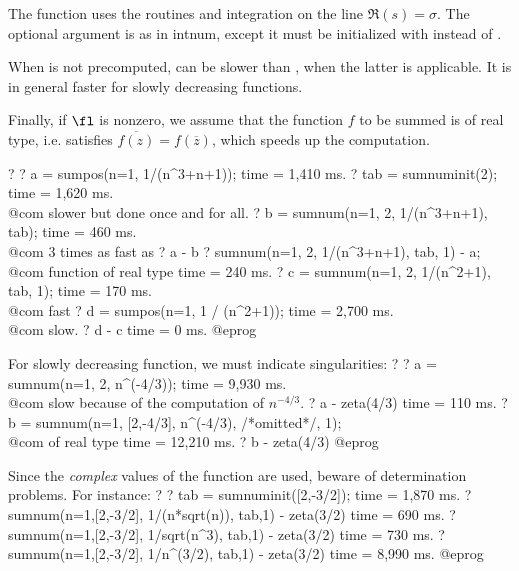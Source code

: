 The function uses the  routines and integration on the line
$\Re(s) = \sigma$. The optional argument  is as in intnum, except it
must be initialized with  instead of .

When  is not precomputed,  can be slower than
, when the latter is applicable. It is in general faster for
slowly decreasing functions.

Finally, if $\fl$ is nonzero, we assume that the function $f$ to be summed is
of real type, i.e. satisfies $\overline{f(z)}=f(\overline{z})$, which
speeds up the computation.

\bprog
? 
? a = sumpos(n=1, 1/(n^3+n+1));
time = 1,410 ms.
? tab = sumnuminit(2);
time = 1,620 ms. \\@com slower but done once and for all.
? b = sumnum(n=1, 2, 1/(n^3+n+1), tab);
time = 460 ms. \\@com 3 times as fast as 
? a - b
? sumnum(n=1, 2, 1/(n^3+n+1), tab, 1) - a; \\@com function of real type
time = 240 ms.
? c = sumnum(n=1, 2, 1/(n^2+1), tab, 1);
time = 170 ms. \\@com fast
? d = sumpos(n=1, 1 / (n^2+1));
time = 2,700 ms. \\@com slow.
? d - c
time = 0 ms.
@eprog

For slowly decreasing function, we must indicate singularities:
\bprog
? 
? a = sumnum(n=1, 2, n^(-4/3));
time = 9,930 ms. \\@com slow because of the computation of $n^{-4/3}$.
? a - zeta(4/3)
time = 110 ms.
? b = sumnum(n=1, [2,-4/3], n^(-4/3), /*omitted*/, 1); \\@com of real type
time = 12,210 ms.
? b - zeta(4/3)
@eprog

Since the \emph{complex} values of the function are used, beware of
determination problems. For instance:
\bprog
? 
? tab = sumnuminit([2,-3/2]);
time = 1,870 ms.
? sumnum(n=1,[2,-3/2], 1/(n*sqrt(n)), tab,1) - zeta(3/2)
time = 690 ms.
? sumnum(n=1,[2,-3/2], 1/sqrt(n^3), tab,1) - zeta(3/2)
time = 730 ms.
? sumnum(n=1,[2,-3/2], 1/n^(3/2), tab,1) - zeta(3/2)
time = 8,990 ms.
@eprog

